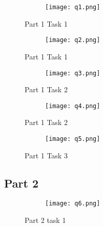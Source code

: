 \documentclass[12pt,a4paper]{article}
\begin{document}
\begin{figure}[h]
\centering
\begin{subfigure}{ 1\textwidth}
\texttt{[image: q1.png]}
\end{subfigure}
\caption{ Part 1 Task 1  }
\label{fig2:image22}
\end{figure}

\begin{figure}[h]
\centering
\begin{subfigure}{ 1\textwidth}
\texttt{[image: q2.png]}
\end{subfigure}
\caption{ Part 1 Task 1 }
\label{fig2:image22}
\end{figure}

\begin{figure}[h]
\centering
\begin{subfigure}{ 1\textwidth}
\texttt{[image: q3.png]}
\end{subfigure}
\caption{ Part 1 Task 2 }
\label{fig2:image22}
\end{figure}

\begin{figure}[h]
\centering
\begin{subfigure}{ 1\textwidth}
\texttt{[image: q4.png]}
\end{subfigure}
\caption{ Part 1  Task 2 }
\label{fig2:image22}
\end{figure}

\begin{figure}[h]
\centering
\begin{subfigure}{ 1\textwidth}
\texttt{[image: q5.png]}
\end{subfigure}
\caption{ Part 1 Task 3 }
\label{fig2:image22}
\end{figure}


\clearpage

\subsection{Part 2}


\begin{figure}[h]
\centering
\begin{subfigure}{ 1\textwidth}
\texttt{[image: q6.png]}
\end{subfigure}
\caption{  Part 2 task 1 }
\label{fig2:image22}
\end{figure}
\end{document}
